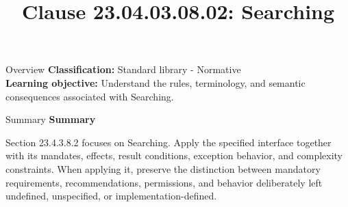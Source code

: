 \documentclass[10pt,letterpaper]{article}
\title{Clause 23.04.03.08.02: Searching}
\author{}
\date{}
\begin{document}
\maketitle
\begin{CornellOverviewBox}{Overview}
\textbf{Classification:} Standard library - Normative\\[2pt]
\textbf{Learning objective:} Understand the rules, terminology, and semantic consequences associated with Searching.
\end{CornellOverviewBox}\begin{CornellSummaryBox}{Summary}
{\sffamily\bfseries\color{Accent} Summary}\par\vspace{3pt}Section 23.4.3.8.2 focuses on Searching. Apply the specified interface together with its mandates, effects, result conditions, exception behavior, and complexity constraints. When applying it, preserve the distinction between mandatory requirements, recommendations, permissions, and behavior deliberately left undefined, unspecified, or implementation-defined.
\end{CornellSummaryBox}
\end{document}
